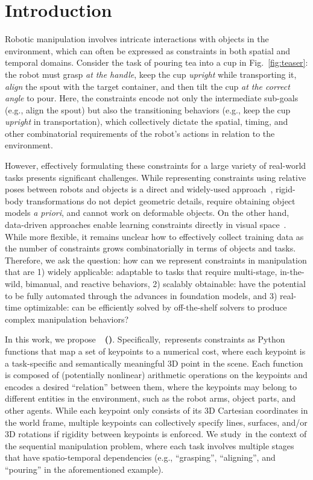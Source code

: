 \section{Introduction}

Robotic manipulation involves intricate interactions with objects in the environment, which can often be expressed as constraints in both spatial and temporal domains.
Consider the task of pouring tea into a cup in Fig.~\ref{fig:teaser}: the robot must grasp \emph{at the handle}, keep the cup \emph{upright} while transporting it, \emph{align} the spout with the target container, and then tilt the cup \emph{at the correct angle} to pour.
Here, the constraints encode not only the intermediate sub-goals (e.g., align the spout) but also the transitioning behaviors (e.g., keep the cup \emph{upright} in transportation), which collectively dictate the spatial, timing, and other combinatorial requirements of the robot's actions in relation to the environment.

However, effectively formulating these constraints for a large variety of real-world tasks presents significant challenges.
While representing constraints using relative poses between robots and objects is a direct and widely-used approach~\cite{kaelbling2010hierarchical}, rigid-body transformations do not depict geometric details, require obtaining object models \textit{a priori}, and cannot work on deformable objects.
On the other hand, data-driven approaches enable learning constraints directly in visual space~\cite{driess2022learning,simeonov2022neural}. While more flexible, it remains unclear how to effectively collect training data as the number of constraints grows combinatorially in terms of objects and tasks.
Therefore, we ask the question: how can we represent constraints in manipulation that are 1) widely applicable: adaptable to tasks that require multi-stage, in-the-wild, bimanual, and reactive behaviors, 2) scalably obtainable: have the potential to be fully automated through the advances in foundation models, and 3) real-time optimizable: can be efficiently solved by off-the-shelf solvers to produce complex manipulation behaviors?

In this work, we propose~\textbf{\algname~(\algabrvname)}.
Specifically,~\algabrvname represents constraints as Python functions that map a set of keypoints to a numerical cost, where each keypoint is a task-specific and semantically meaningful 3D point in the scene.
Each function is composed of (potentially nonlinear) arithmetic operations on the keypoints and encodes a desired ``relation'' between them, where the keypoints may belong to different entities in the environment, such as the robot arms, object parts, and other agents.
While each keypoint only consists of its 3D Cartesian coordinates in the world frame, multiple keypoints can collectively specify lines, surfaces, and/or 3D rotations if rigidity between keypoints is enforced.
We study~\algabrvname in the context of the sequential manipulation problem, where each task involves multiple stages that have spatio-temporal dependencies (e.g., ``grasping'', ``aligning'', and ``pouring'' in the aforementioned example).



